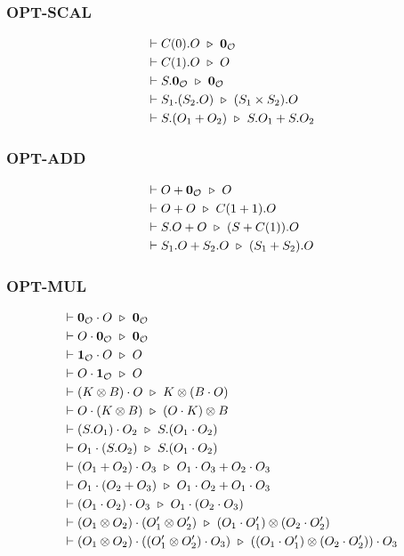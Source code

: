 \subsubsection*{\textsf{OPT-SCAL}}
\begin{align*}
  & \vdash C(0).O \ \triangleright\  \mathbf{0}_\mathcal{O} \\
  & \vdash C(1).O \ \triangleright\  O \\
  & \vdash S.\textbf{0}_\mathcal{O} \ \triangleright\  \textbf{0}_\mathcal{O} \\
  & \vdash S_1.(S_2.O) \ \triangleright\  (S_1 \times S_2).O \\
  & \vdash S.(O_1 + O_2) \ \triangleright\  S.O_1 + S.O_2
\end{align*}

\subsubsection*{\textsf{OPT-ADD}}
\begin{align*}
  & \vdash O + \mathbf{0}_\mathcal{O} \ \triangleright\  O \\
  & \vdash O + O \ \triangleright\  C(1 + 1).O \\
  & \vdash S.O + O \ \triangleright\  (S + C(1)).O \\
  & \vdash S_1.O + S_2.O \ \triangleright\  (S_1 + S_2).O
\end{align*}

\subsubsection*{\textsf{OPT-MUL}}
\begin{align*}
  & \vdash \mathbf{0}_\mathcal{O} \cdot O \ \triangleright\  \mathbf{0}_\mathcal{O} \\
  & \vdash O \cdot \mathbf{0}_\mathcal{O} \ \triangleright\  \mathbf{0}_\mathcal{O} \\
  & \vdash \mathbf{1}_\mathcal{O} \cdot O \ \triangleright\  O \\
  & \vdash O \cdot \mathbf{1}_\mathcal{O} \ \triangleright\  O \\
  & \vdash (K \otimes B) \cdot O \ \triangleright\  K \otimes (B \cdot O)\\
  & \vdash O \cdot (K \otimes B) \ \triangleright\  (O \cdot K) \otimes B\\
  & \vdash (S.O_1) \cdot O_2 \ \triangleright\  S.(O_1 \cdot O_2) \\
  & \vdash O_1 \cdot (S.O_2) \ \triangleright\  S.(O_1 \cdot O_2) \\
  & \vdash (O_1 + O_2) \cdot O_3 \ \triangleright\  O_1 \cdot O_3 + O_2 \cdot O_3 \\
  & \vdash O_1 \cdot (O_2 + O_3) \ \triangleright\  O_1 \cdot O_2 + O_1 \cdot O_3 \\
  & \vdash (O_1 \cdot O_2) \cdot O_3 \ \triangleright\  O_1 \cdot (O_2 \cdot O_3) \\
  & \vdash (O_1 \otimes O_2) \cdot (O_1' \otimes O_2') \ \triangleright\  (O_1 \cdot O_1') \otimes (O_2 \cdot O_2') \\
  & \vdash (O_1 \otimes O_2) \cdot ((O_1' \otimes O_2') \cdot O_3) \ \triangleright\  ((O_1 \cdot O_1') \otimes (O_2 \cdot O_2')) \cdot O_3
\end{align*}



